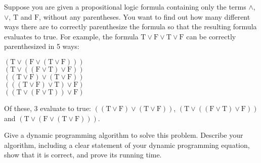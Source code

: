 \problem{}
Suppose you are given a propositional logic formula containing only the terms $\land$, $\lor$, $\text{T}$ and $\text{F}$, without any parentheses. You want to find out how many different ways there are to correctly parenthesize the formula so that the resulting formula evaluates to true. For example, the formula $\text{T} \lor \text{F} \lor \text{T} \lor \text{F}$ can be correctly parenthesized in 5 ways:
\begin{center}
$(\text{T} \lor (\text{F} \lor (\text{T} \lor \text{F})))$ \\
$(\text{T} \lor ((\text{F} \lor \text{T}) \lor \text{F}))$ \\
$((\text{T} \lor \text{F}) \lor (\text{T} \lor \text{F}))$ \\
$(((\text{T} \lor \text{F}) \lor \text{T}) \lor \text{F})$ \\
$((\text{T} \lor (\text{F} \lor \text{T})) \lor \text{F})$
\end{center}
Of these, 3 evaluate to true: $((\text{T} \lor \text{F}) \lor (\text{T} \lor \text{F}))$, $(\text{T} \lor ((\text{F} \lor \text{T}) \lor \text{F}))$ and $(\text{T} \lor (\text{F} \lor (\text{T} \lor \text{F})))$.

Give a dynamic programming algorithm to solve this problem. Describe your algorithm, including a clear statement of your dynamic programming equation, show that it is correct, and prove its running time.

\solution{}






